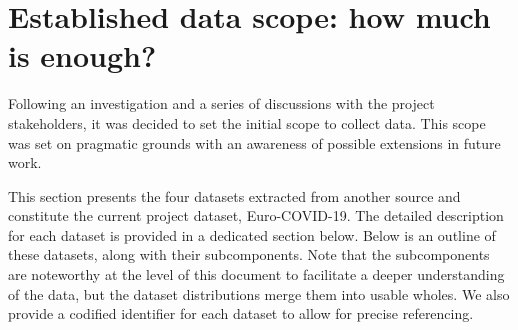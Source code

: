 \section{Established data scope: how much is enough?}

Following an investigation and a series of discussions with the project stakeholders, it was decided to set the initial scope to collect data. This scope was set on pragmatic grounds with an awareness of possible extensions in future work.

This section presents the four datasets extracted from another source and constitute the current project dataset, Euro-COVID-19. The detailed description for each dataset is provided in a dedicated section below. Below is an outline of these datasets, along with their subcomponents. Note that the subcomponents are noteworthy at the level of this document to facilitate a deeper understanding of the data, but the dataset distributions merge them into usable wholes. We also provide a codified identifier for each dataset to allow for precise referencing.

